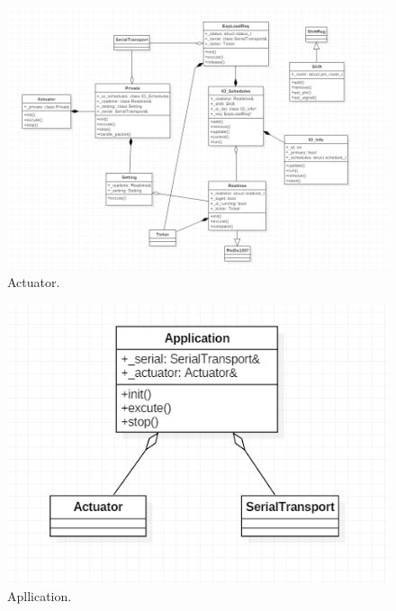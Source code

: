 \documentclass[a4paper,12pt,oneside]{article}
\begin{document}
\begin{itemize}
\begin{itemize}
\begin{figure}[H]
\centering
\begin{center}
\includegraphics[scale=.75]{hinh/class_actuator.PNG}
\end{center}
\caption{Actuator.}
\end{figure}

\begin{figure}[H]
\centering
\begin{center}
\includegraphics[scale=.85]{hinh/class_stmapplication.PNG}
\end{center}
\caption{Apllication.}
\end{figure}

\end{itemize}

\end{itemize}
\newpage
\end{document}
